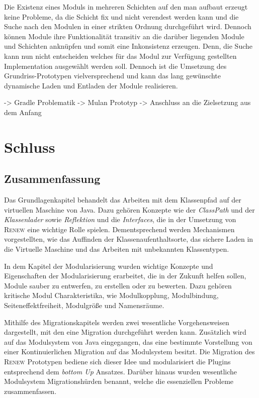Die Existenz eines Moduls in mehreren Schichten auf den man aufbaut erzeugt keine Probleme, da die Schicht fix und nicht verendest werden kann und die Suche nach den Modulen in einer strikten Ordnung durchgeführt wird. Dennoch können Module ihre Funktionalität transitiv an die darüber liegenden Module und Schichten anknüpfen und somit eine Inkonsistenz erzeugen. Denn, die Suche kann nun nicht entscheiden welches für das Modul zur Verfügung gestellten Implementation ausgewählt werden soll. \newline
Dennoch ist die Umsetzung des Grundriss-Prototypen vielversprechend und kann das lang gewünschte dynamische Laden und Entladen der Module realisieren. \bigbreak


-> Gradle Problematik 
-> Mulan Prototyp 
-> Anschluss an die Zielsetzung aus dem Anfang 



\chapter{Schluss}


\section{Zusammenfassung}

Das Grundlagenkapitel behandelt das Arbeiten mit dem Klassenpfad auf der virtuellen Maschine von Java. Dazu gehören Konzepte wie der \textit{ClassPath} und der \textit{Klassenlader} sowie \textit{Reflektion} und die \textit{Interfaces}, die in der Umsetzung von \textsc{Renew} eine wichtige Rolle spielen. Dementsprechend werden Mechanismen vorgestellten, wie das Auffinden der Klassenaufenthaltsorte, das sichere Laden in die Virtuelle Maschine und das Arbeiten mit unbekannten Klassentypen.\bigbreak

In dem Kapitel der Modularisierung wurden wichtige Konzepte und Eigenschaften der Modularisierung erarbeitet, die in der Zukunft helfen sollen, Module sauber zu entwerfen, zu erstellen oder zu bewerten. Dazu gehören kritische Modul Charakteristika, wie Modulkopplung, Modulbindung, Seiteneffektfreiheit, Modulgröße und Namensräume. \bigbreak

Mithilfe des Migrationskapitels werden zwei wesentliche Vorgehensweisen dargestellt, mit den eine Migration durchgeführt werden kann. Zusätzlich wird auf das Modulsystem von Java eingegangen, das eine bestimmte Vorstellung von einer Kontinuierlichen Migration auf das Modulsystem besitzt. \newline
Die Migration des \textsc{Renew} Prototypen bediene sich dieser Idee und modularisiert die Plugins entsprechend dem \textit{bottom Up} Ansatzes. Darüber hinaus wurden wesentliche Modulsystem Migrationshürden benannt, welche die essenziellen Probleme zusammenfassen. \bigbreak

